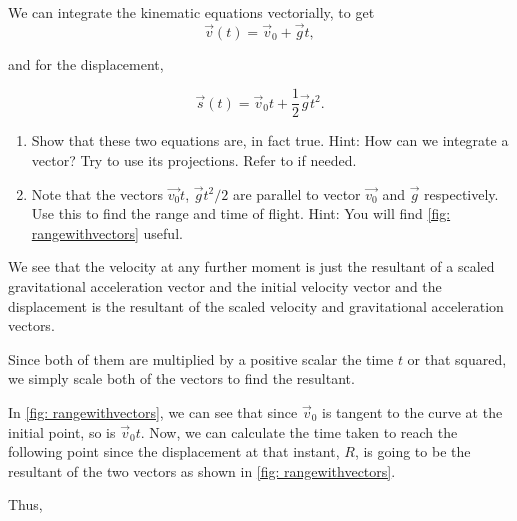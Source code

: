 \begin{exc}
    \begin{exercise}[subtitle={Projectile with vectors.}, points = 3]
        We can integrate the kinematic equations 
        vectorially, to get 
        \begin{equation*}
            \vec{v}(t) = \vec{v}_0 + \vec{g}t,
        \end{equation*}
        
        and for the displacement,
        
        \begin{equation*}
            \vec{s}(t) = \vec{v}_0t + \frac{1}{2}\vec{g}t^2.
        \end{equation*}

        \begin{enumerate}[label=(\alph*)]
            \item Show that these two equations are, in fact true. Hint: How can we integrate a vector? Try to use its projections. Refer to   if needed.
            \item Note that the vectors \(\vec{v_0}t\), \(\vec{g}t^2/2\) are parallel to vector \(\vec{v_0}\) and \(\vec{g}\) respectively. Use this to find the range and time of flight. Hint: You will find \cref{fig: rangewithvectors} useful. 
        \end{enumerate}
    \end{exercise}

    \begin{solution}
        We see that the velocity at any further moment is just the resultant of a scaled 
        gravitational acceleration vector and the initial velocity vector and the displacement is the resultant of 
        the scaled velocity and gravitational acceleration vectors. 
        
        Since both of them are multiplied by a positive scalar the time \(t\) or that squared, we simply
        scale both of the vectors to find the resultant.
        
        In \cref{fig: rangewithvectors}, we can see that since \(\vec{v}_0\) is tangent 
        to the curve at the initial point, so is \(\vec{v}_0t\). Now, we can calculate 
        the time taken to reach the following point since the displacement at that instant, 
        \(R\), is going to be the resultant of the two vectors as shown in \cref{fig: rangewithvectors}.
        
        Thus,


\end{solution}
\end{exc}
